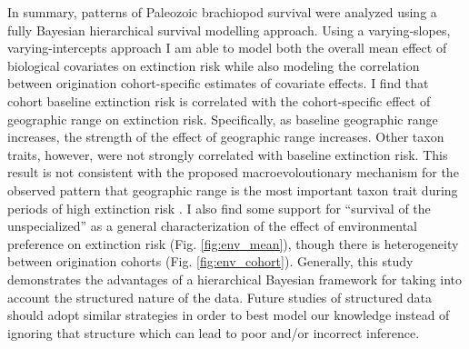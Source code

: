 \documentclass[12pt,letterpaper]{article}
\begin{document}
In summary, patterns of Paleozoic brachiopod survival were analyzed using a fully Bayesian hierarchical survival modelling approach. Using a varying-slopes, varying-intercepts approach I am able to model both the overall mean effect of biological covariates on extinction risk while also modeling the correlation between origination cohort-specific estimates of covariate effects. I find that cohort baseline extinction risk is correlated with the cohort-specific effect of geographic range on extinction risk. Specifically, as baseline geographic range increases, the strength of the effect of geographic range increases. Other taxon traits, however, were not strongly correlated with baseline extinction risk. This result is not consistent with the proposed macroevoloutionary mechanism for the observed pattern that geographic range is the most important taxon trait during periods of high extinction risk \citet{Jablonski1986}. I also find some support for ``survival of the unspecialized'' \citep{Simpson1944,Liow2004a,Liow2007b,Nurnberg2013a,Nurnberg2015} as a general characterization of the effect of environmental preference on extinction risk (Fig. \ref{fig:env_mean}), though there is heterogeneity between origination cohorts (Fig. \ref{fig:env_cohort}). Generally, this study demonstrates the advantages of a hierarchical Bayesian framework for taking into account the structured nature of the data. Future studies of structured data should adopt similar strategies in order to best model our knowledge instead of ignoring that structure which can lead to poor and/or incorrect inference.
\end{document}
